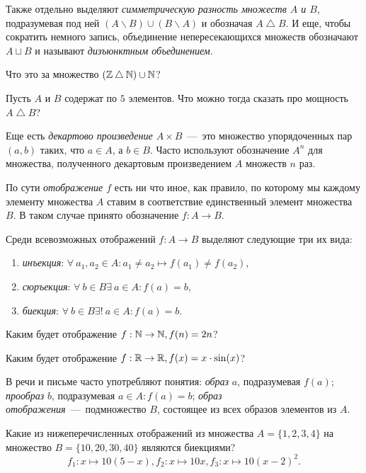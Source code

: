 	Также отдельно выделяют \emph{симметрическую разность множеств $A$ и $B$}, подразумевая под ней 
	$(A \backslash B) \cup (B \backslash A)$ и обозначая $A \bigtriangleup B$. И еще, чтобы сократить
	немного запись, объединение непересекающихся множеств обозначают $A \sqcup B$ и называют
	\emph{дизъюнктным объединением}.
	
\begin{testquestion}
	Что это за множество $(\mathbb{Z} \bigtriangleup \mathbb{N}) \cup \mathbb{N}$?
\end{testquestion}

\begin{testquestion}
	Пусть $A$ и $B$ содержат по $5$ элементов. Что можно тогда сказать про мощность $A \bigtriangleup B$?
\end{testquestion}

	Еще есть \emph{декартово произведение $A \times B$}~---~это множество упорядоченных пар $(a, b)$ таких, 
	что $a \in A$, а $b \in B$. Часто используют обозначение $A^n$ для множества, полученного декартовым произведением $A$ множеств $n$ раз.
	
	
	По сути \emph{отображение $f$} есть ни что иное, как правило, по которому мы каждому элементу множества $A$ ставим в 
	соответствие единственный элемент множества $B$. В таком случае принято обозначение $f: A \to B$.
	
	Среди всевозможных отображений $f: A \to B$ выделяют следующие три их вида:

\begin{enumerate}
	\item \emph{инъекция}: $\forall \!\ a_1, a_2 \in A \colon a_1 \neq a_2 \mapsto f(a_1) \neq f(a_2)$,
	\item \emph{сюръекция}: $\forall \!\ b \in B \exists \!\ a \in A \colon f(a) = b$,
	\item \emph{биекция}: $\forall \!\ b \in B \exists! \!\ a \in A \colon f(a) = b$.
\end{enumerate}

\begin{testquestion}
	Каким будет отображение $f: \mathbb{N} \to \mathbb{N}, f(n) = 2n$?
\end{testquestion}

\begin{testquestion}
	Каким будет отображение $f: \mathbb{R} \to \mathbb{R}, f(x) = x \cdot \sin(x)$?
\end{testquestion}

	В речи и письме часто употребляют понятия: \emph{образ} $a$, подразумевая $f(a)$; \emph{прообраз} $b$, 
	подразумевая $a \in A \colon f(a) = b$; \emph{образ отображения}~---~подмножество $B$, состоящее из всех образов элементов из $A$.
	
\begin{testquestion}
	Какие из нижеперечисленных отображений из множества $A = \{ 1, 2, 3, 4\}$ на множество $B = \{ 10, 20, 30, 40\}$ являются биекциями?
	$$f_1\colon x \mapsto 10(5-x), f_2\colon x \mapsto 10x, f_3\colon x \mapsto 10 (x-2)^2.$$
\end{testquestion}
